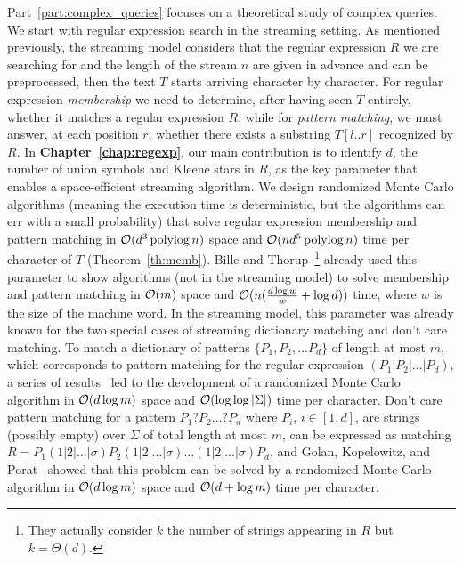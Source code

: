 Part~\ref{part:complex_queries} focuses on a theoretical study of complex queries. 
%
We start with regular expression search in the streaming setting.
%
As mentioned previously, the streaming model considers that the regular expression $R$ we are searching for and the length of the stream $n$ are given in advance and can be preprocessed, then the text $T$ starts arriving character by character. For regular expression \emph{membership} we need to determine, after having seen $T$ entirely, whether it matches a regular expression $R$, while for \emph{pattern matching}, we must answer, at each position $r$, whether there exists a substring $T[l..r]$ recognized by $R$.
In \textbf{Chapter~\ref{chap:regexp}}, our main contribution is to identify $d$, the number of union symbols and Kleene stars in $R$, as the key parameter that enables a space-efficient streaming algorithm. We design randomized Monte Carlo algorithms (meaning the execution time is deterministic, but the algorithms can err with a small probability) that solve regular expression membership and pattern matching in $\mathcal{O}(d^3\operatorname{polylog} n)$ space and $\mathcal{O}(nd^5\operatorname{polylog} n)$ time per character of $T$ (Theorem~\ref{th:memb}).
Bille and Thorup~\cite{doi:10.1137/1.9781611973075.104}\footnote{They actually consider $k$ the number of strings appearing in $R$ but $k=\Theta(d)$.} already used this parameter to  show algorithms (not in the streaming model) to solve membership and pattern matching in $\mathcal{O}(m)$ space and $\mathcal{O}(n(\frac{d\log w}{w} + \log d))$ time, where $w$ is the size of the machine word.
In the streaming model, this parameter was already known for the two special cases of streaming dictionary matching and don't care matching. To match a dictionary of patterns $\{P_1, P_2, ... P_d \}$ of length at most $m$, which corresponds to pattern matching for the regular expression $(P_1| P_2| ... | P_d)$, a series of results~\cite{Porat:09,DBLP:journals/talg/BreslauerG14,DBLP:conf/esa/CliffordFPSS15,DBLP:conf/esa/GolanP17,DBLP:conf/icalp/GolanKP18} led to the development of a randomized Monte Carlo algorithm in $\mathcal{O}(d\log m)$ space and $\mathcal{O}(\log \log |\Sigma|)$ time per character.
Don't care pattern matching for a pattern $P_1 ? P_2 ... ? P_d$ where $P_i$, $i \in [1,d]$, are strings (possibly empty) over $\Sigma$ of total length at most $m$, can be expressed as matching $R = P_1 (1|2|\ldots|\sigma) P_2 (1|2|\ldots|\sigma) \ldots (1|2|\ldots|\sigma) P_{d}$, and Golan, Kopelowitz, and Porat~\cite{DBLP:journals/algorithmica/GolanKP19} showed that this problem can be solved by a randomized Monte Carlo algorithm in $\mathcal{O}(d \log m)$ space and $\mathcal{O}(d+\log m)$ time per character.

